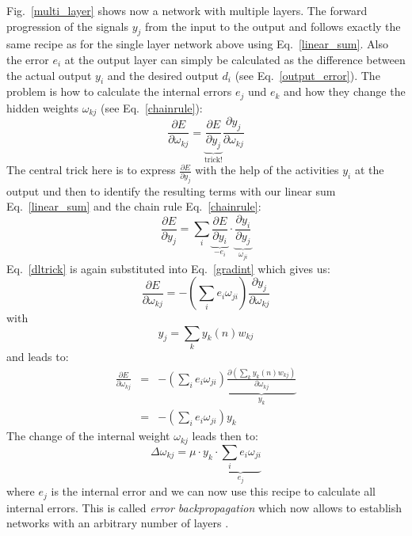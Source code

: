 \documentclass[12pt]{article}
\begin{document}
Fig.~\ref{multi_layer} shows now a network with multiple layers.
The forward progression of the signals $y_j$ from the input to
the output and follows exactly the same recipe as for the single
layer network above using Eq.~\ref{linear_sum}.
Also the error $e_i$ at the output layer can simply be calculated
as the difference between the actual output $y_i$ and the desired output $d_i$ (see
Eq.~\ref{output_error}). The problem is how to calculate the
internal errors $e_j$ und $e_k$ and how they change the hidden weights $\omega_{kj}$
(see Eq.~\ref{chainrule}):
\begin{equation}
  \frac{\partial E}{\partial \omega_{kj}} = \underbrace{\frac{\partial E}{\partial y_j}}_\textrm{trick!} \frac{\partial y_j}{\partial \omega_{kj}}
  \label{gradint}
\end{equation}
The central trick here is to express $\frac{\partial E}{\partial y_j}$
with the help of the activities $y_i$ at the output und then to
identify the resulting terms with our linear sum Eq.~\ref{linear_sum}
and the chain rule Eq.~\ref{chainrule}:
\begin{equation}
  \frac{\partial E}{\partial y_j} = \sum_i \underbrace{\frac{\partial E}{\partial y_i}}_{-e_i} \cdot \underbrace{\frac{\partial y_i}{\partial y_j}}_{\omega_{ji}} \label{dltrick}
\end{equation}
Eq.~\ref{dltrick} is again substituted into Eq.~\ref{gradint} which gives us:
\begin{equation}
  \frac{\partial E}{\partial \omega_{kj}} = - \left( \sum_i e_i \omega_{ji} \right) \frac{\partial y_j}{\partial \omega_{kj}}
  \label{gradintback}
\end{equation}
with
\begin{equation}
y_j = \sum_k y_k(n) w_{kj}
\end{equation}
and leads to:
\begin{eqnarray}
  \frac{\partial E}{\partial \omega_{kj}} & = & - \left( \sum_i e_i \omega_{ji} \right) \underbrace{\frac{\partial \left(\sum_k y_k(n) w_{kj}\right)}{\partial \omega_{kj}}}_{y_k} \\
                                         & = & - \left( \sum_i e_i \omega_{ji} \right) y_k
\end{eqnarray}
The change of the internal weight $\omega_{kj}$ leads then to:
\begin{equation}
\Delta\omega_{kj} = \mu \cdot y_k \cdot \underbrace{\sum_i e_i \omega_{ji}}_{e_j}
\end{equation}
where $e_j$ is the internal error and we can now use this recipe to
calculate all internal errors.  This is called \textsl{error
  backpropagation} which now allows to establish networks with an
arbitrary number of layers \citep{Widrow60,rumelhart1986learning,Widrow1990}.
\end{document}

